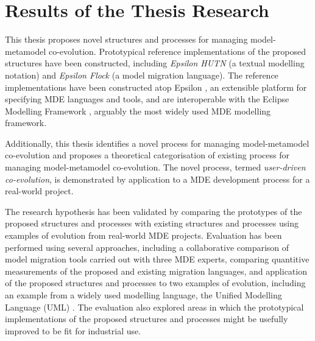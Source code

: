 
\section{Results of the Thesis Research}
\label{sec:research_results}

This thesis proposes novel structures and processes for managing model-met\-amo\-del co-evolution. Prototypical reference implementations of the proposed structures have been constructed, including \emph{Epsilon HUTN} (a textual modelling notation) and \emph{Epsilon Flock} (a model migration language). The reference implementations have been constructed atop Epsilon \cite{kolovos09thesis}, an extensible platform for specifying MDE languages and tools, and are interoperable with the Eclipse Modelling Framework \cite{steinberg09emf}, arguably the most widely used MDE modelling framework.

Additionally, this thesis identifies a novel process for managing model-metamodel co-evolution and proposes a theoretical categorisation of existing process for managing model-metamodel co-evolution. The novel process, termed \emph{user-driven co-evolution}, is demonstrated by application to a MDE development process for a real-world project.

The research hypothesis has been validated by comparing the prototypes of the proposed structures and processes with existing structures and processes using examples of evolution from real-world MDE projects. Evaluation has been performed using several approaches, including a collaborative comparison of model migration tools carried out with three MDE experts, comparing quantitive measurements of the proposed and existing migration languages, and application of the proposed structures and processes to two examples of evolution, including an example from a widely used modelling language, the Unified Modelling Language (UML) \cite{uml212}. The evaluation also explored areas in which the prototypical implementations of the proposed structures and processes might be usefully improved to be fit for industrial use.




